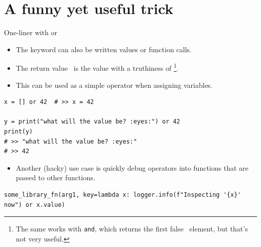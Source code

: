\documentclass[12pt, aspectratio=169, usepdftitle=false]{beamer}
\newcommand{\pp}[1]{\lpl{#1}}
\begin{document}
\section{A funny yet useful trick}
\begin{frame}[fragile]{One-liner with \glqq or\grqq}
	\begin{itemize}
		\item The keyword \pp{or} can also be written  values or function calls.
		
		\pause
		
		\item The \glqq return value\grqq~ is the  value with a truthiness of \pp{True}\footnote{The same works with \texttt{and}, which returns the first \glqq false\grqq~ element, but that’s not very useful.}.
		
		\pause
		
		\item This can be used as a simple  operator when assigning variables.
	\end{itemize}
	\begin{lstlisting}[language=pytiny]
x = [] or 42  # >> x = 42

y = print("what will the value be? :eyes:") or 42
print(y)
# >> "what will the value be? :eyes:"
# >> 42
	\end{lstlisting}
	
	\pause
	
	\begin{itemize}
			\item Another (hacky) use case is quickly  debug operators into functions that are passed to other functions.
	\end{itemize}
	\begin{lstlisting}[language=pytiny]
some_library_fn(arg1, key=lambda x: logger.info(f"Inspecting '{x}' now") or x.value)
	\end{lstlisting}
\end{frame}


{}
\end{document}
